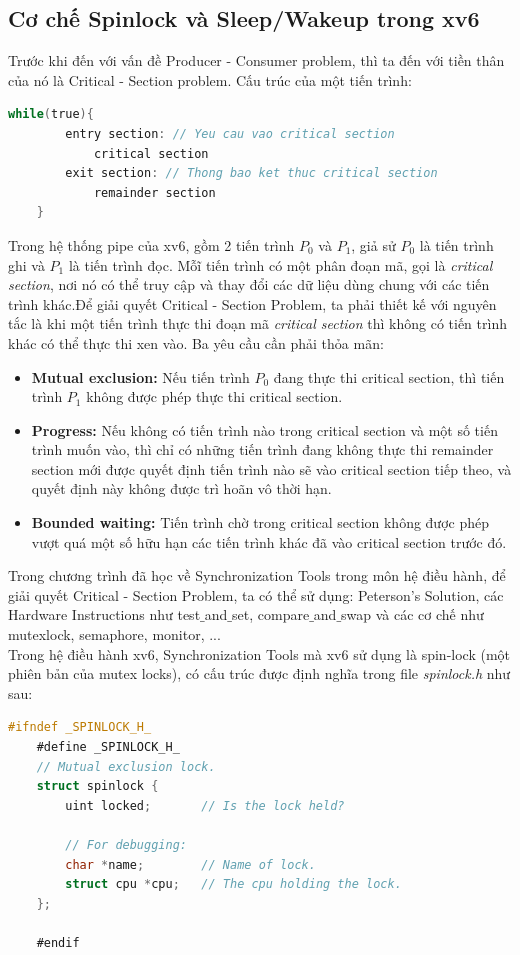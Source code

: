 \documentclass[12pt,a4paper]{article}
\begin{document}
\subsection{Cơ chế Spinlock và Sleep/Wakeup trong xv6}
Trước khi đến với vấn đề Producer - Consumer problem, thì ta đến với tiền thân của nó là Critical - Section problem. Cấu trúc của một tiến trình:
\begin{lstlisting}[language=C]
    while(true){
        entry section: // Yeu cau vao critical section
            critical section
        exit section: // Thong bao ket thuc critical section
            remainder section
    }
\end{lstlisting}
Trong hệ thống pipe của xv6, gồm 2 tiến trình $P_0$ và $P_1$, giả sử  $P_0$ là tiến trình ghi và $P_1$ là tiến trình đọc. Mỗĩ tiến trình có một 
phân đoạn mã, gọi là \textit{critical section}, nơi nó có thể truy cập và thay đổi các dữ liệu dùng chung với các tiến trình khác.Để giải quyết Critical - Section Problem, ta phải thiết kế với nguyên tắc là khi một tiến trình thực thi đoạn mã 
\textit{critical section} thì không có tiến trình khác có thể thực thi xen vào. Ba yêu cầu cần phải thỏa mãn:
\begin{itemize}
    \item \textbf{Mutual exclusion:} Nếu tiến trình $P_0$ đang thực thi critical section, thì tiến trình $P_1$ không được phép thực thi critical section.
    \item \textbf{Progress:} Nếu không có tiến trình nào trong critical section và một số tiến trình muốn vào, thì chỉ có những tiến trình đang không thực thi remainder section mới được quyết định tiến trình nào sẽ vào critical section tiếp theo, và quyết định này không được trì hoãn vô thời hạn.
    \item \textbf{Bounded waiting:} Tiến trình chờ trong critical section không được phép vượt quá một số hữu hạn các tiến trình khác đã vào critical section trước đó.
\end{itemize}
Trong chương trình đã học về Synchronization Tools trong môn hệ điều hành, để giải quyết Critical - Section Problem, ta có thể sử dụng: Peterson's Solution, các Hardware Instructions như test$\_$and$\_$set, compare$\_$and$\_$swap và các cơ chế như mutexlock, semaphore, monitor, ...\\
Trong hệ điều hành xv6, Synchronization Tools mà xv6 sử dụng là spin-lock (một phiên bản của mutex locks), có cấu trúc được định nghĩa trong file \textit{spinlock.h} như sau:
\begin{lstlisting}[language=C]
    #ifndef _SPINLOCK_H_
    #define _SPINLOCK_H_
    // Mutual exclusion lock.
    struct spinlock {
        uint locked;       // Is the lock held?

        // For debugging:
        char *name;        // Name of lock.
        struct cpu *cpu;   // The cpu holding the lock.
    };

    #endif
\end{lstlisting}
\end{document}
